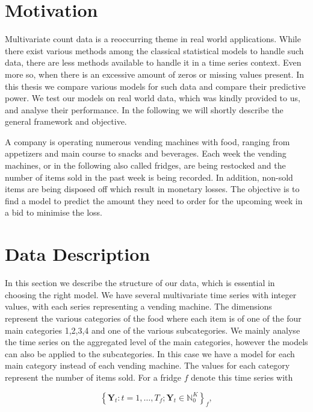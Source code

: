 \section{Motivation}
\label{sec:Motivation}

Multivariate count data is a reoccurring theme in real world applications. While there exist various methods among the classical statistical models to handle such data, there are less methods available to handle it in a time series context. Even more so, when there is an excessive amount of zeros or missing values present. In this thesis we compare various models for such data and compare their predictive power. We test our models on real world data, which was kindly provided to us, and analyse their performance. In the following we will shortly describe the general framework and objective. 

A company is operating numerous vending machines with food, ranging from appetizers and main course to snacks and beverages. Each week the vending machines, or in the following also called fridges, are being restocked and the number of items sold in the past week is being recorded. In addition, non-sold items are being disposed off which result in monetary losses. The objective is to find a model to predict the amount they need to order for the upcoming week in a bid to minimise the loss.

\section{Data Description}
\label{sec: Data Description}

In this section we describe the structure of our data, which is essential in choosing the right model. We have several multivariate time series with integer values, with each series representing a vending machine. The dimensions represent the various categories of the food where each item is of one of the four main categories 1,2,3,4 and one of the various subcategories. We mainly analyse the time series on the aggregated level of the main categories, however the models can also be applied to the subcategories. In this case we have a model for each main category instead of each vending machine. The values for each category represent the number of items sold. For a fridge $f$ denote this time series with 

\begin{equation}
\left\{\bm{Y}_t:t=1,\ldots,T_f; \bm{Y}_t \in \mathbb{N}_0^K \right\}_f,
\label{eq:time series definition}
\end{equation}

